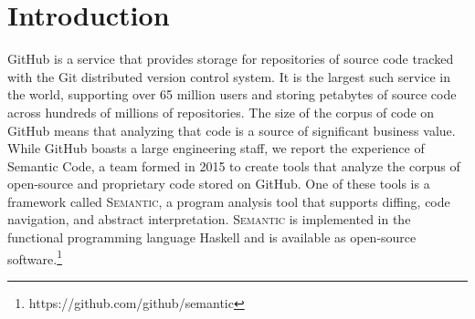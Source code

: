 \documentclass[acmsmall,fleqn,12pt]{acmart}
\begin{document}

\newcommand{\semantic}{\textsc{Semantic}}
\newcommand{\fe}{\textsc{Fused-Effects}}
\newcommand{\fastsum}{\textsc{Fastsum}}


\begin{abstract}
  GitHub hosts hundreds of millions of code repositories written in hundreds
  of different programming languages. In addition to its hosting services,
  GitHub provides data and insights into code, such as vulnerability analysis
  and code navigation, with which users can improve and understand their software
  development process. GitHub has built \semantic{}, a program analysis tool
  capable of parsing and extracting detailed information from source code. The
  development of \semantic{} has relied extensively on the functional
  programming literature; this paper describes how connections to academic
  research inspired and informed the development of an industrial-scale program
  analysis toolkit.
\end{abstract}


\maketitle


\section{Introduction}

GitHub is a service that provides storage for repositories of source code
tracked with the Git distributed version control system. It is the largest
such service in the world, supporting over 65 million users and storing
petabytes of source code across hundreds of millions of repositories. The
size of the corpus of code on GitHub means that analyzing that code is a
source of significant business value. While GitHub boasts a large
engineering staff, we report the experience of Semantic Code, a team formed
in 2015 to create tools that analyze the corpus of open-source and
proprietary code stored on GitHub. One of these tools is a framework called
\semantic{}, a program analysis tool that supports diffing, code navigation,
and abstract interpretation. \semantic{} is implemented in the functional
programming language Haskell and is available as open-source
software.\footnote{https://github.com/github/semantic}
\end{document}
